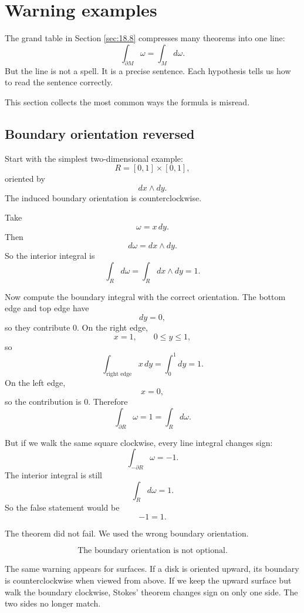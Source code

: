 \section{Warning examples}
\label{sec:18.9}

The grand table in Section \ref{sec:18.8} compresses many theorems into one line:
\[
    \int_{\partial M}\omega=\int_M d\omega.
\]
But the line is not a spell.  It is a precise sentence.  Each hypothesis tells us how to
read the sentence correctly.

This section collects the most common ways the formula is misread.

\subsection{Boundary orientation reversed}

Start with the simplest two-dimensional example:
\[
    R=[0,1]\times[0,1],
\]
oriented by
\[
    dx\wedge dy.
\]
The induced boundary orientation is counterclockwise.

Take
\[
    \omega=x\,dy.
\]
Then
\[
    d\omega=dx\wedge dy.
\]
So the interior integral is
\[
    \int_R d\omega=\int_R dx\wedge dy=1.
\]

Now compute the boundary integral with the correct orientation.  The bottom edge and
top edge have
\[
    dy=0,
\]
so they contribute \(0\).  On the right edge,
\[
    x=1,\qquad 0\le y\le1,
\]
so
\[
    \int_{\text{right edge}}x\,dy=\int_0^1dy=1.
\]
On the left edge,
\[
    x=0,
\]
so the contribution is \(0\).  Therefore
\[
\boxed{
    \int_{\partial R}\omega=1=\int_Rd\omega.
}
\]

But if we walk the same square clockwise, every line integral changes sign:
\[
    \int_{-\partial R}\omega=-1.
\]
The interior integral is still
\[
    \int_R d\omega=1.
\]
So the false statement would be
\[
    -1=1.
\]

The theorem did not fail.  We used the wrong boundary orientation.

\[
\boxed{
    \text{The boundary orientation is not optional.}
}
\]

The same warning appears for surfaces.  If a disk is oriented upward, its boundary is
counterclockwise when viewed from above.  If we keep the upward surface but walk the
boundary clockwise, Stokes' theorem changes sign on only one side.  The two sides no
longer match.

